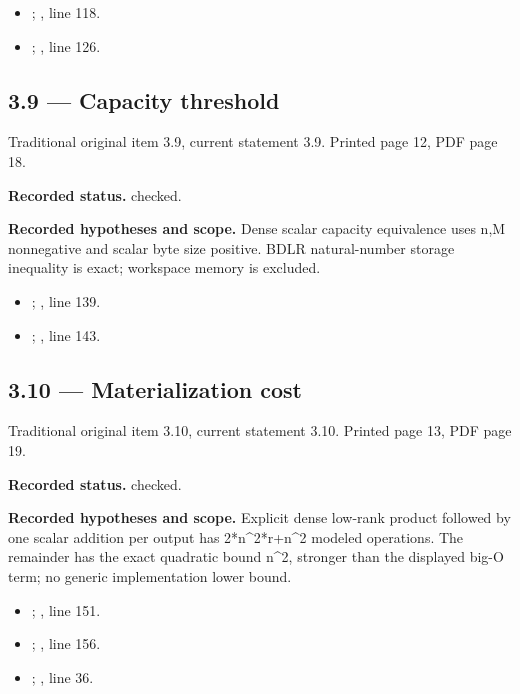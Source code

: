 \begin{itemize}
\item {}; , line 118.
\item {}; , line 126.
\end{itemize}
\subsection{3.9 — Capacity threshold}
\label{result:3.9}
{\footnotesize\color{muted}Traditional original item 3.9, current statement 3.9. Printed page 12, PDF page 18.}\par
\textbf{Recorded status.} checked.

\textbf{Recorded hypotheses and scope.} Dense scalar capacity equivalence uses n,M nonnegative and scalar byte size positive. BDLR natural-number storage inequality is exact; workspace memory is excluded.

\begin{itemize}
\item {}; , line 139.
\item {}; , line 143.
\end{itemize}
\subsection{3.10 — Materialization cost}
\label{result:3.10}
{\footnotesize\color{muted}Traditional original item 3.10, current statement 3.10. Printed page 13, PDF page 19.}\par
\textbf{Recorded status.} checked.

\textbf{Recorded hypotheses and scope.} Explicit dense low-rank product followed by one scalar addition per output has 2*n\textasciicircum{}2*r+n\textasciicircum{}2 modeled operations. The remainder has the exact quadratic bound n\textasciicircum{}2, stronger than the displayed big-O term; no generic implementation lower bound.

\begin{itemize}
\item {}; , line 151.
\item {}; , line 156.
\item {}; , line 36.
\end{itemize}
